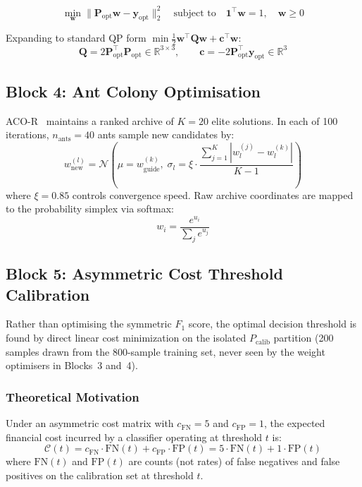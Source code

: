 \documentclass[12pt,a4paper]{article}
\begin{document}
\[
\min_{\mathbf{w}} \|\mathbf{P}_\text{opt} \mathbf{w} - \mathbf{y}_\text{opt}\|_2^2 \quad \text{subject to} \quad \mathbf{1}^\top \mathbf{w} = 1, \quad \mathbf{w} \geq 0
\]

Expanding to standard QP form $\min \frac{1}{2}\mathbf{w}^\top \mathbf{Q}\mathbf{w} + \mathbf{c}^\top \mathbf{w}$:
\[
\mathbf{Q} = 2\mathbf{P}_\text{opt}^\top \mathbf{P}_\text{opt} \in \mathbb{R}^{3\times3}, \qquad \mathbf{c} = -2\mathbf{P}_\text{opt}^\top \mathbf{y}_\text{opt} \in \mathbb{R}^3
\]

\subsection{Block 4: Ant Colony Optimisation}

ACO-R~\citep{socha2008ant} maintains a ranked archive of $K=20$ elite solutions. In each of 100 iterations, $n_\text{ants}=40$ ants sample new candidates by:
\[
w^{(l)}_\text{new} = \mathcal{N}\!\left(\mu = w^{(k)}_\text{guide}, \; \sigma_l = \xi \cdot \frac{\sum_{j=1}^{K} |w^{(j)}_l - w^{(k)}_l|}{K-1}\right)
\]
where $\xi = 0.85$ controls convergence speed. Raw archive coordinates are mapped to the probability simplex via softmax:
\[
w_i = \frac{e^{u_i}}{\sum_j e^{u_j}}
\]

\subsection{Block 5: Asymmetric Cost Threshold Calibration}

Rather than optimising the symmetric $F_1$ score, the optimal decision threshold is
found by direct linear cost minimization on the isolated $P_\text{calib}$ partition
(200 samples drawn from the 800-sample training set, never seen by the weight
optimisers in Blocks~3 and~4).

\subsubsection{Theoretical Motivation}

Under an asymmetric cost matrix with $c_\text{FN} = 5$ and $c_\text{FP} = 1$, the
expected financial cost incurred by a classifier operating at threshold $t$ is:
\[
    \mathcal{C}(t) = c_\text{FN} \cdot \text{FN}(t) + c_\text{FP} \cdot \text{FP}(t)
                   = 5 \cdot \text{FN}(t) + 1 \cdot \text{FP}(t)
\]
where $\text{FN}(t)$ and $\text{FP}(t)$ are counts (not rates) of false negatives and
false positives on the calibration set at threshold $t$.
\end{document}
